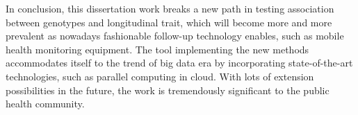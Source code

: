 \documentclass[12pt]{article}
\begin{document}
In conclusion, this dissertation work breaks a new path in testing association between genotypes and longitudinal trait, which will become more and more prevalent as nowadays fashionable follow-up technology enables, such as mobile health monitoring equipment. The tool implementing the new methods accommodates itself to the trend of big data era by incorporating state-of-the-art technologies, such as parallel computing in cloud. With lots of extension possibilities in the future, the work is tremendously significant to the public health community.





\newpage


\end{document}
